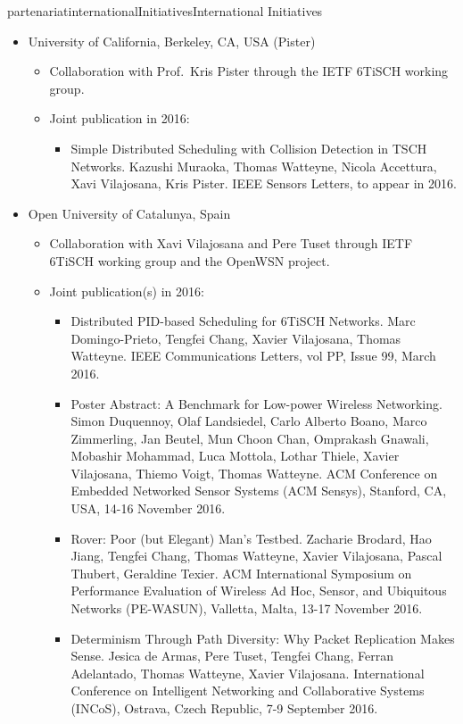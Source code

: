 \documentclass{ra2016}
\begin{document}
\begin{module}{partenariat}{internationalInitiatives}{International Initiatives}
\begin{itemize}
    \item University of California, Berkeley, CA, USA (Pister)
        \begin{itemize}
            \item Collaboration with Prof.~Kris Pister through the IETF 6TiSCH working group.
            \item Joint publication in 2016:
                \begin{itemize}
                    \item Simple Distributed Scheduling with Collision Detection in TSCH Networks. Kazushi Muraoka, Thomas Watteyne, Nicola Accettura, Xavi Vilajosana, Kris Pister. IEEE Sensors Letters, to appear in 2016.
                \end{itemize}
        \end{itemize}
    \item Open University of Catalunya, Spain
        \begin{itemize}
            \item Collaboration with Xavi Vilajosana and Pere Tuset through IETF 6TiSCH working group and the OpenWSN project.
            \item Joint publication(s) in 2016:
                \begin{itemize}
                    \item Distributed PID-based Scheduling for 6TiSCH Networks. Marc Domingo-Prieto, Tengfei Chang, Xavier Vilajosana, Thomas Watteyne. IEEE Communications Letters, vol PP, Issue 99, March 2016.
                    \item Poster Abstract: A Benchmark for Low-power Wireless Networking. Simon Duquennoy, Olaf Landsiedel, Carlo Alberto Boano, Marco Zimmerling, Jan Beutel, Mun Choon Chan, Omprakash Gnawali, Mobashir Mohammad, Luca Mottola, Lothar Thiele, Xavier Vilajosana, Thiemo Voigt, Thomas Watteyne. ACM Conference on Embedded Networked Sensor Systems (ACM Sensys), Stanford, CA, USA, 14-16 November 2016.
                    \item Rover: Poor (but Elegant) Man's Testbed. Zacharie Brodard, Hao Jiang, Tengfei Chang, Thomas Watteyne, Xavier Vilajosana, Pascal Thubert, Geraldine Texier. ACM International Symposium on Performance Evaluation of Wireless Ad Hoc, Sensor, and Ubiquitous Networks (PE-WASUN), Valletta, Malta, 13-17 November 2016.
                    \item Determinism Through Path Diversity: Why Packet Replication Makes Sense. Jesica de Armas, Pere Tuset, Tengfei Chang, Ferran Adelantado, Thomas Watteyne, Xavier Vilajosana. International Conference on Intelligent Networking and Collaborative Systems (INCoS), Ostrava, Czech Republic, 7-9 September 2016.

\end{itemize}
\end{itemize}
\end{itemize}
\end{module}
\end{document}

